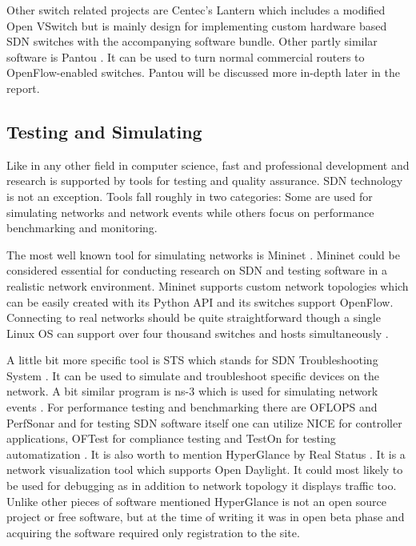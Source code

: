 Other switch related projects are Centec’s Lantern \cite{Lantern} which includes a modified Open VSwitch but is mainly design for implementing custom hardware based SDN switches with the accompanying software bundle. Other partly similar software is Pantou \cite{Yia04}. It can be used to turn normal commercial routers to OpenFlow-enabled switches. Pantou will be discussed more in-depth later in the report.

\subsection{Testing and Simulating}

Like in any other field in computer science, fast and professional development and research is supported by tools for testing and quality assurance. SDN technology is not an exception. Tools fall roughly in two categories: Some are used for simulating networks and network events while others focus on performance benchmarking and monitoring.

The most well known tool for simulating networks is Mininet \cite{MN14}. Mininet could be considered essential for conducting research on SDN and testing software in a realistic network environment. Mininet supports custom network topologies which can be easily created with its Python API and its switches support OpenFlow. Connecting to real networks should be quite straightforward though a single Linux OS can support over four thousand switches and hosts simultaneously \cite{MN14}. 

A little bit more specific tool is STS which stands for SDN Troubleshooting System \cite{STS}. It can be used to simulate and troubleshoot specific devices on the network. A bit similar program is ns-3 which is used for simulating network events \cite{NS3}. For performance testing and benchmarking there are OFLOPS and PerfSonar \cite{OFLOPS, Perf} and for testing SDN software itself one can utilize NICE \cite{NICE} for controller applications, OFTest for compliance testing \cite{OFTest} and TestOn for testing automatization \cite{TestOn}. It is also worth to mention HyperGlance by Real Status \cite{Hyper}. It is a network visualization tool which supports Open Daylight. It could most likely to be used for debugging as in addition to network topology it displays traffic too. Unlike other pieces of software mentioned HyperGlance is not an open source project or free software, but at the time of writing it was in open beta phase and acquiring the software required only registration to the site.

